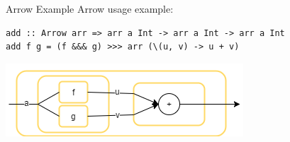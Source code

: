 \begin{frame}[fragile]{Arrow Example}
	Arrow usage example:
\begin{lstlisting}[frame=htrbl]
add :: Arrow arr => arr a Int -> arr a Int -> arr a Int
add f g = (f &&& g) >>> arr (\(u, v) -> u + v)
\end{lstlisting}
	\begin{center}
		\includegraphics[scale=0.6]{images/addA-comb}
	\end{center}
\end{frame}